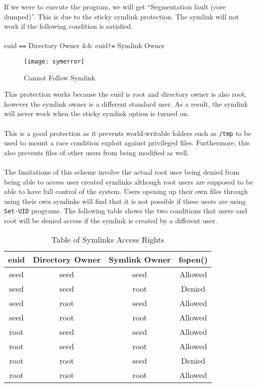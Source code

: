 \documentclass[a4paper,12pt]{article}
\newcommand*\circled[1]{\tikz[baseline=(char.base)]{
		\node[shape=circle,draw,inner sep=2pt] (char) {#1};}}
\begin{document}
\noindent If we were to execute the program, we will get ``Segmentation fault (core dumped)''. This is due to the sticky symlink protection. The symlink will not work if the following condition is satisfied.\\\\euid \texttt{==} Directory Owner \&\& euid\texttt{!=} Symlink Owner
\begin{figure}[H]
	\centering
	\texttt{[image: symerror]}
	\caption{Cannot Follow Symlink}
	\label{fig:symerror}
\end{figure}
\noindent \circled{1} This protection works because the euid is root and directory owner is also root, however the symlink owner is a different standard user. As a result, the symlink will never work when the sticky symlink option is turned on.
\\\\\circled{2} This is a good protection as it prevents world-writable folders such as \texttt{/tmp} to be used to mount a race condition exploit against privileged files. Furthermore, this also prevents files of other users from being modified as well.
\\\\\circled{3} The limitations of this scheme involve the actual root user being denied from being able to access user created symlinks although root users are supposed to be able to have full control of the system. Users opening up their own files through using their own symlinks will find that it is not possible if these users are using \texttt{Set-UID} programs. The following table shows the two conditions that users and root will be denied access if the symlink is created by a different user.
\begin{table}[H]
	\centering
	\label{symtab}
	\bgroup
	\def\arraystretch{1.3}
	\begin{tabular}{|c|c|c|c|}
		\hline
		euid & Directory Owner & Symlink Owner & fopen() \\ \hline
		seed & seed            & seed          & Allowed \\ \hline
		\rowcolor[HTML]{fffe65}
		seed & seed            & root          & Denied  \\ \hline
		seed & root            & seed          & Allowed \\ \hline
		seed & root            & root          & Allowed \\ \hline
		root & seed            & seed          & Allowed \\ \hline
		root & seed            & root          & Allowed \\ \hline
		\rowcolor[HTML]{fffe65} 
		root & root            & seed          & Denied  \\ \hline
		root & root            & root          & Allowed \\ \hline
	\end{tabular}
	\egroup
	\caption{Table of Symlinks Access Rights}
\end{table}
\end{document}
